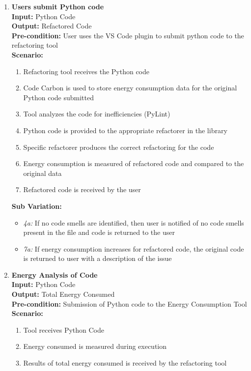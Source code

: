 \documentclass[12pt]{article}
\begin{document}
\begin{enumerate}[label={\bf BUC \arabic*:}, wide=0pt, font=\itshape]
  \item {\bf Users submit Python code} \\[2mm]
    \textbf{Input:} Python Code \\
    \textbf{Output:} Refactored Code \\
    \textbf{Pre-condition:} User uses the VS Code plugin to submit
    python code to the
    refactoring tool \\[2mm]
    \textbf{Scenario:}
    \begin{enumerate}[label=\arabic*.]
      \item Refactoring tool receives the Python code
      \item Code Carbon is used to store energy consumption data for the
        original Python code submitted
      \item Tool analyzes the code for inefficiencies (PyLint)
      \item Python code is provided to the appropriate refactorer in the library
      \item Specific refactorer produces the correct refactoring for the code
      \item Energy consumption is measured of refactored code and
        compared to the original data
      \item Refactored code is received by the user
    \end{enumerate}
    \textbf{Sub Variation: }
    \begin{itemize}
      \item \textit{4a:} If no code smells are identified, then user
        is notified of no code
        smells present in the file and code is returned to the user
      \item \textit{7a:} If energy consumption increases for
        refactored code, the original
        code is returned to user with a description of the issue
    \end{itemize}

  \item {\bf Energy Analysis of Code}\\[2mm]
    \textbf{Input:} Python Code \\
    \textbf{Output:} Total Energy Consumed \\
    \textbf{Pre-condition:} Submission of Python code to the Energy
    Consumption Tool \\[2mm]
    \textbf{Scenario: }
    \begin{enumerate}[label=\arabic*.]
      \item Tool receives Python Code
      \item Energy consumed is measured during execution
      \item Results of total energy consumed is received by the refactoring tool
    \end{enumerate}


\end{enumerate}
\end{document}

